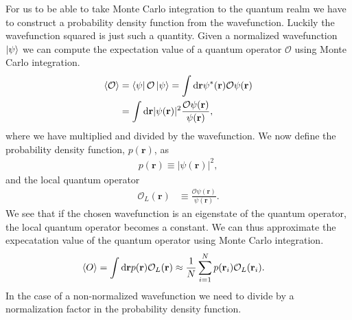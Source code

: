 \documentclass[
    a4paper, aps, twocolumn, floatfix, superscriptaddress,
    nofootinbib]{revtex4-1}
\newcommand{\vf}{\mathbf}
\newcommand{\1}{\mathds{1}}
\begin{document}
        For us to be able to take Monte Carlo integration to the quantum realm
        we have to construct a probability density function from the
        wavefunction. Luckily the wavefunction squared is just such a quantity.
        Given a normalized wavefunction $\ket{\psi}$ we can compute the
        expectation value of a quantum operator $\mathcal{O}$ using Monte
        Carlo integration.
        \begin{align}
            \expval{\mathcal{O}}
            &= \bra{\psi}\mathcal{O}\ket{\psi}
            =
            \int\dd\vf{r}
            \psi^{*}(\vf{r})\mathcal{O}\psi(\vf{r})
            \\
            &=
            \int\dd\vf{r}
            |\psi(\vf{r})|^2
            \frac{\mathcal{O}\psi(\vf{r})}{\psi(\vf{r})},
        \end{align}
        where we have multiplied and divided by the wavefunction. We now define
        the probability density function, $p(\vf{r})$, as
        \begin{align}
            p(\vf{r}) \equiv |\psi(\vf{r})|^2,
        \end{align}
        and the local quantum operator
        \begin{align}
            \mathcal{O}_L(\vf{r})
            &\equiv \frac{\mathcal{O}\psi(\vf{r})}{\psi(\vf{r})}.
        \end{align}
        We see that if the chosen wavefunction is an eigenstate of the quantum
        operator, the local quantum operator becomes a constant.  We can thus
        approximate the expecatation value of the quantum operator using Monte
        Carlo integration.
        \begin{align}
            \expval{O}
            &=
            \int\dd\vf{r}
            p(\vf{r})
            \mathcal{O}_L(\vf{r})
            \approx
            \frac{1}{N}\sum_{i = 1}^N
            p(\vf{r}_i)\mathcal{O}_L(\vf{r}_i).
        \end{align}
        In the case of a non-normalized wavefunction we need to divide by a
        normalization factor in the probability density function.
\end{document}

